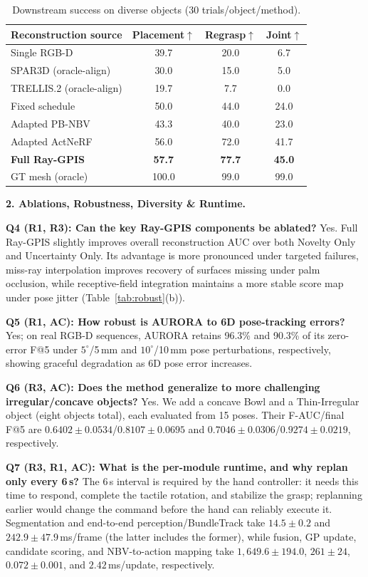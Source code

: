 \documentclass[conference]{IEEEtran}
\newcommand{\newparagraph}[1]{{\bf #1.}}
\begin{document}
\begin{table}[t]
\centering
\caption{Downstream success on diverse objects (30 trials/object/method).
}
\label{tab:downstream}
\begin{tabularx}{\linewidth}{Xccc}
\toprule
Reconstruction source & Placement$\uparrow$ & Regrasp$\uparrow$ & Joint$\uparrow$ \\
\midrule
Single RGB-D & 39.7 & 20.0 & 6.7 \\
SPAR3D (oracle-align) & 30.0 & 15.0 & 5.0 \\
TRELLIS.2 (oracle-align) & 19.7 & 7.7 & 0.0 \\
\midrule
Fixed schedule & 50.0 & 44.0 & 24.0 \\
Adapted PB-NBV & 43.3 & 40.0 & 23.0 \\
Adapted ActNeRF & 56.0 & 72.0 & 41.7 \\
\textbf{Full Ray-GPIS} & \textbf{57.7} & \textbf{77.7} & \textbf{45.0} \\
\midrule
GT mesh (oracle) & 100.0 & 99.0 & 99.0 \\
\bottomrule
\end{tabularx}
\end{table}

\newparagraph{2. Ablations, Robustness, Diversity \& Runtime}

\textbf{Q4 (R1, R3): Can the key Ray-GPIS components be ablated?}
Yes. Full Ray-GPIS slightly improves overall reconstruction AUC over both
Novelty Only and Uncertainty Only. Its advantage is more
pronounced under targeted failures, miss-ray interpolation improves recovery
of surfaces missing under palm occlusion, while receptive-field integration
maintains a more stable score map under pose jitter
(Table~\ref{tab:robust}(b)).

\textbf{Q5 (R1, AC): How robust is AURORA to 6D pose-tracking errors?}
Yes; on real RGB-D sequences, AURORA retains 96.3\% and 90.3\% of its
zero-error F@5 under $5^\circ$/5\,mm and $10^\circ$/10\,mm pose perturbations,
respectively, showing graceful degradation as 6D pose error increases.

\textbf{Q6 (R3, AC): Does the method generalize to more challenging
irregular/concave objects?} Yes. We add a concave Bowl and a Thin-Irregular
object (eight objects total), each evaluated from 15 poses. Their F-AUC/final
F@5 are $0.6402{\pm}0.0534$/$0.8107{\pm}0.0695$ and
$0.7046{\pm}0.0306$/$0.9274{\pm}0.0219$, respectively.

\textbf{Q7 (R3, R1, AC): What is the per-module runtime, and why replan
only every 6\,s?} The 6\,s interval is required by the hand controller: it needs
this time to respond, complete the tactile rotation, and stabilize the grasp;
replanning earlier would change the command before the hand can reliably
execute it. Segmentation and end-to-end perception/BundleTrack take
$14.5{\pm}0.2$ and $242.9{\pm}47.9$\,ms/frame (the latter includes the former),
while fusion, GP update, candidate scoring, and NBV-to-action mapping take
$1,649.6{\pm}194.0$, $261{\pm}24$, $0.072{\pm}0.001$, and $2.42$\,ms/update,
respectively.
\end{document}
